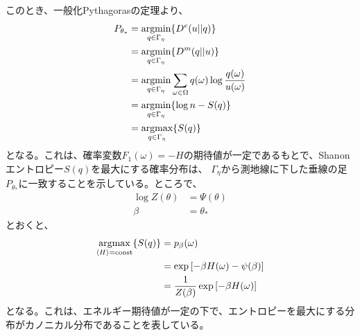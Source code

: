 \documentclass[a4paper,11pt]{jsarticle}
\numberwithin{equation}{section}
\begin{document}
このとき、一般化Pythagorasの定理より、
\begin{align}
    P_{\theta_*} &= \underset{q \in \Gamma_\eta}{\text{argmin}} \qty{D^e(u||q)} \\
    &= \underset{q \in \Gamma_\eta}{\text{argmin}} \qty{D^m(q||u)}\\
    &= \underset{q \in \Gamma_\eta}{\text{argmin}} \sum_{\omega \in \Omega} q(\omega) \log \frac{q(\omega)}{u(\omega)}\\
    &= \underset{q \in \Gamma_\eta}{\text{argmin}} \{\log n -S(q)\}\\
    &= \underset{q \in \Gamma_\eta}{\text{argmax}} \{S(q)\}
\end{align}
となる。これは、確率変数$F_1(\omega) = -H$の期待値が一定であるもとで、Shanonエントロピー$S(q)$を最大にする確率分布は、
$\Gamma_{\eta}$から測地線に下した垂線の足$P_{\theta_*}$に一致することを示している。ところで、
\begin{align}
    \log Z(\theta) &= \Psi(\theta)\\
    \beta &= \theta_{*}
\end{align}
とおくと、
\begin{align}
    \underset{\ev{H} = \text{const}}{\text{argmax}} \{S(q)\} &= p_{\beta}(\omega)\\
    &= \exp\left[ -\beta H(\omega) - \psi(\beta) \right]\\
    &= \frac{1}{Z(\beta)} \exp\left[ -\beta H(\omega) \right]
\end{align}
となる。これは、エネルギー期待値が一定の下で、エントロピーを最大にする分布がカノニカル分布であることを表している。
\end{document}
